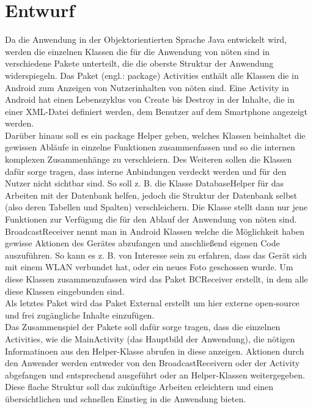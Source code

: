 \documentclass[10pt, a4paper,headsepline]{scrreprt}
\begin{document}
\section{Entwurf}
Da die Anwendung in der Objektorientierten Sprache Java entwickelt wird, werden die einzelnen Klassen die für die Anwendung von nöten sind in verschiedene Pakete unterteilt, die die oberste Struktur der Anwendung widerspiegeln. Das Paket (engl.: package)  Activities enthält alle Klassen die in Android zum Anzeigen von Nutzerinhalten von nöten sind. Eine Activity in Android hat einen Lebenszyklus von Create bis Destroy in der Inhalte, die in einer XML-Datei definiert werden, dem Benutzer auf dem Smartphone angezeigt werden. \\
Darüber hinaus soll es ein package Helper geben, welches Klassen beinhaltet die gewissen Abläufe in einzelne Funktionen zusammenfassen und so die internen komplexen Zusammenhänge zu verschleiern. Des Weiteren sollen die Klassen dafür sorge tragen, dass interne Anbindungen verdeckt werden und für den Nutzer nicht sichtbar sind. So soll z. B. die Klasse DatabaseHelper für das Arbeiten mit der Datenbank helfen, jedoch die Struktur der Datenbank selbst (also deren Tabellen und Spalten) verschleichern. Die Klasse stellt dann nur jene Funktionen zur Verfügung die für den Ablauf der Anwendung von nöten sind. \\
BroadcastReceiver nennt man in Android Klassen welche die Möglichkeit haben gewisse Aktionen des Gerätes abzufangen und anschließend eigenen Code auszuführen. So kann es z. B. von Interesse sein zu erfahren, dass das Gerät sich mit einem WLAN verbundet hat, oder ein neues Foto geschossen wurde. Um diese Klassen zusammenzufassen wird das Paket BCReceiver erstellt, in dem alle diese Klassen eingebunden sind. \\
Als letztes Paket wird das Paket External erstellt um hier externe open-source und frei zugängliche Inhalte einzufügen. \\
Das Zusammenspiel der Pakete soll dafür sorge tragen, dass die einzelnen Activities, wie die MainActivity (das Hauptbild der Anwendung), die nötigen Informatinoen aus den Helper-Klasse abrufen in diese anzeigen. Aktionen durch den Anwender werden entweder von den BroadcastReceivern oder der Activity abgefangen und entsprechend ausgeführt oder an Helper-Klassen weitergegeben.  Diese flache Struktur soll das zukünftige Arbeiten erleichtern und einen übersichtlichen und schnellen Einstieg in die Anwendung bieten. \\ \\
\end{document}
